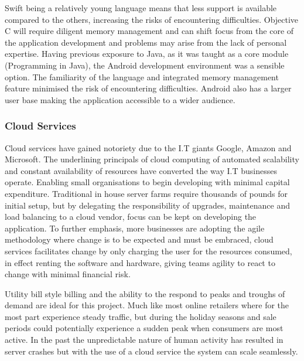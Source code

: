 \documentclass[a4paper, 11pt]{article}
\begin{document}
Swift being a relatively young language means that less support is available compared to the others, increasing the risks of encountering difficulties. Objective C will require diligent memory management and can shift focus from the core of the application development and problems may arise from the lack of personal expertise. Having previous exposure to Java, as it was taught as a core module (Programming in Java), the Android development environment was a sensible option. The familiarity of the language and integrated memory management feature minimised the risk of encountering difficulties. Android also has a larger user base making the application accessible to a wider audience.

\subsubsection{Cloud Services} 
Cloud services have gained notoriety due to the I.T giants Google, Amazon and Microsoft. The underlining principals of cloud computing of automated scalability and constant availability of resources have converted the way I.T businesses operate. Enabling small organisations to begin developing with minimal capital expenditure. Traditional in house server farms require thousands of pounds for initial setup, but by delegating the responsibility of upgrades, maintenance and load balancing to a cloud vendor, focus can be kept on developing the application. To further emphasis, more businesses are adopting the agile methodology where change is to be expected and must be embraced\cite{agile}, cloud services facilitates change by only charging the user for the resources consumed, in effect renting the software and hardware, giving teams agility to react to change with minimal financial risk.

Utility bill style billing and the ability to the respond to peaks and troughs of demand are ideal for this project. Much like most online retailers where for the most part experience steady traffic, but during the holiday seasons and sale periods could potentially experience a sudden peak when consumers are most active. In the past the unpredictable nature of human activity has resulted in server crashes but with the use of a cloud service the system can scale seamlessly.
\end{document}

